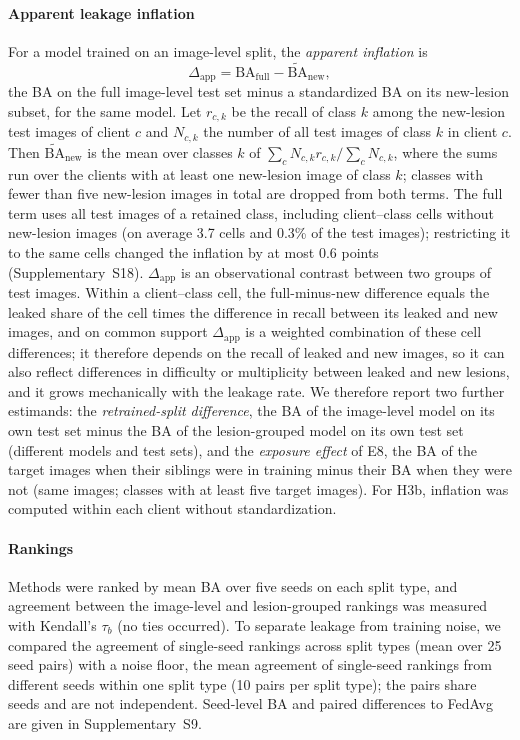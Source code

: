 \documentclass[VANCOUVER,Times1COL]{WileyNJDv5}
\begin{document}
\paragraph{Apparent leakage inflation} For a model trained on an image-level split, the \emph{apparent
inflation} is
\begin{equation}
  \Delta_{\text{app}} = \mathrm{BA}_{\text{full}} - \widetilde{\mathrm{BA}}_{\text{new}},
  \label{eq:inflation}
\end{equation}
the BA on the full image-level test set minus a standardized BA on its new-lesion subset, for the same
model. Let $r_{c,k}$ be the recall of class $k$ among the new-lesion test images of client $c$ and $N_{c,k}$
the number of all test images of class $k$ in client $c$. Then $\widetilde{\mathrm{BA}}_{\text{new}}$ is
the mean over classes $k$ of $\sum_c N_{c,k} r_{c,k}/\sum_c N_{c,k}$, where the sums run over the clients
with at least one new-lesion image of class $k$; classes with fewer than five new-lesion images in total
are dropped from both terms. The full term uses all test images of a retained class, including client--class cells without new-lesion images (on average 3.7 cells and 0.3\% of the test images); restricting it to the same cells changed the inflation by at most 0.6 points (Supplementary~S18). $\Delta_{\text{app}}$ is an observational contrast between two groups of test
images. Within a client--class cell, the full-minus-new difference equals the leaked share of the cell times the difference in recall between its leaked and new images, and on common support $\Delta_{\text{app}}$ is a weighted combination of these cell differences; it therefore depends on the recall of leaked and new
images, so it can also reflect differences in difficulty or multiplicity between leaked and new lesions,
and it grows mechanically with the leakage rate. We therefore report two further estimands: the
\emph{retrained-split difference}, the BA of the image-level model on its own test set minus the BA of the
lesion-grouped model on its own test set (different models and test sets), and the \emph{exposure effect}
of E8, the BA of the target images when their siblings were in training minus their BA when they were
not (same images; classes with at least five target images). For H3b, inflation was computed within each
client without standardization.

\paragraph{Rankings} Methods were ranked by mean BA over five seeds on each split type, and agreement
between the image-level and lesion-grouped rankings was measured with Kendall's $\tau_b$ (no ties occurred). To separate leakage from training noise, we compared the
agreement of single-seed rankings across split types (mean over 25 seed pairs) with a noise floor, the
mean agreement of single-seed rankings from different seeds within one split type (10 pairs per split
type); the pairs share seeds and are not independent. Seed-level BA and paired differences to FedAvg are given in
Supplementary~S9.
\end{document}
